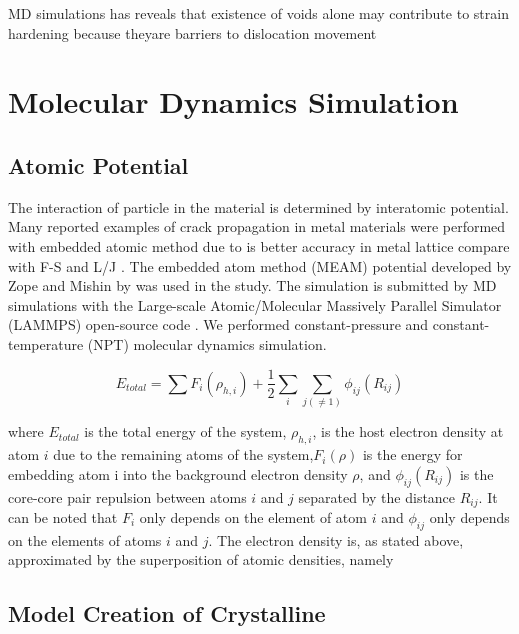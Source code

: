 \documentclass[journal,article,submit,moreauthors,pdftex,10pt,a4paper]{Definitions/mdpi}
\begin{document}
MD simulations has reveals that existence of voids alone may contribute to strain hardening because theyare barriers to dislocation movement \cite{Xiong2015}



\section{Molecular Dynamics Simulation }
	
\subsection{Atomic Potential}

The interaction of particle in the material is determined by interatomic potential. Many reported examples of crack propagation in metal materials were performed with embedded atomic method due to is better accuracy in metal lattice compare with F-S and L/J \cite{}. The embedded atom method (MEAM) potential developed by Zope and Mishin by \cite{} was used in the study. The simulation is submitted by MD simulations with the Large-scale Atomic/Molecular Massively Parallel Simulator (LAMMPS) open-source code \cite{}. We performed constant-pressure and constant-temperature (NPT) molecular dynamics simulation.
	
\begin{equation} \label{eq:eam} 
E_{total}= \displaystyle\sum F_i(\rho_{h,i})+\frac{1}{2}\sum_i\sum_{j(\neq1)}\phi_{ij}(R_{ij})
\end{equation}
	
where $E_{total}$ is the total energy of the system, $\rho_{h,i}$, is the host electron density at atom $i$ due to the remaining atoms of the system,$F_i(\rho)$ is the energy for embedding atom i into the background electron density $\rho$, and $\phi_{ij}(R_{ij})$ is the core-core pair repulsion between atoms $i$ and $j$ separated by the distance $R_{ij}$. It can be noted that $F_i$ only depends on the element of atom $i$ and $\phi_{ij}$ only depends on the elements of atoms $i$ and $j$. The electron density is, as stated above, approximated by the superposition of atomic densities, namely
	
%	
\subsection{Model Creation of Crystalline}
\end{document}
